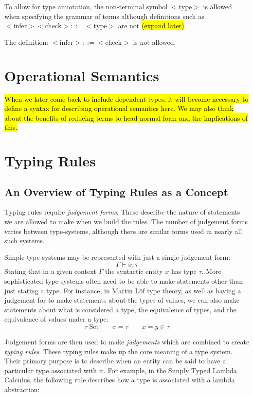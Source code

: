 To allow for type annotation, the non-terminal symbol $<\mbox{type}>$
is allowed when specifying the grammar of terms although definitions
such as $<\mbox{infer}> <\mbox{check}> ::= <\mbox{type}>$ are not
\hl{(expand later)}.

The definition: $<\mbox{infer}> ::= <\mbox{check}>$ is not allowed.

\section{Operational Semantics}

\hl{When we later come back to include dependent types, it will become
necessary to define a syntax for describing operational semantics
here. We may also think about the benefits of reducing terms to
head-normal form and the implications of this.}

\section{Typing Rules}

\subsection{An Overview of Typing Rules as a Concept}

Typing rules require \emph{judgement forms}. These describe the nature
of statements we are allowed to make when we build the rules. The
number of judgement forms varies between type-systems, although there
are similar forms used in nearly all such systems.

Simple type-systems may be represented with just a single judgement
form:
$$\boxed{\Gamma \vdash x : \tau}$$
Stating that in a given context $\Gamma$ the syntactic entity
$x$ has type $\tau$. More sophisticated type-systems often need to be
able to make statements other than just stating a type. For instance,
in Martin L\"of type theory, as well as having a judgement for to make
statements about the types of values, we can also make statements
about what is considered a type, the equivalence of types, and the
equivalence of values under a type:
$$\boxed{\tau \; \mbox{Set}} \qquad \boxed{\sigma = \tau} \qquad \boxed{x = y
  \in \tau}$$

Judgement forms are then used to make \emph{judgements} which are
combined to create \emph{typing rules}. These typing rules make up the
core meaning of a type system. Their primary purpose is to describe
when an entity can be said to have a particular type associated with
it. For example, in the Simply Typed Lambda Calculus, the following
rule describes how a type is associated with a lambda abstraction:

